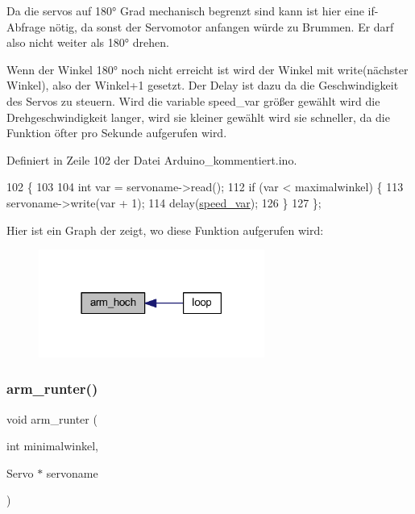 Da die servos auf 180° Grad mechanisch begrenzt sind kann ist hier eine if-\/\+Abfrage nötig, da sonst der Servomotor anfangen würde zu Brummen. Er darf also nicht weiter als 180° drehen.

Wenn der Winkel 180° noch nicht erreicht ist wird der Winkel mit write(nächster Winkel), also der Winkel+1 gesetzt. Der Delay ist dazu da die Geschwindigkeit des Servos zu steuern. Wird die variable speed\+\_\+var größer gewählt wird die Drehgeschwindigkeit langer, wird sie kleiner gewählt wird sie schneller, da die Funktion öfter pro Sekunde aufgerufen wird.

Definiert in Zeile 102 der Datei Arduino\+\_\+kommentiert.\+ino.


\begin{DoxyCode}
102                                                     \{
103 
104   \textcolor{keywordtype}{int} var = servoname->read(); 
112   \textcolor{keywordflow}{if} (var < maximalwinkel) \{
113     servoname->write(var + 1);
114     delay(\hyperlink{_arduino__kommentiert_8ino_a8b03f5396d8e845086daab48dcaca5cb}{speed\_var});
126   \}
127 \};
\end{DoxyCode}
Hier ist ein Graph der zeigt, wo diese Funktion aufgerufen wird\+:\nopagebreak
\begin{figure}[H]
\begin{center}
\leavevmode
\includegraphics[width=210pt]{_arduino__kommentiert_8ino_a74bfcf85e5418694eb99df53d30c8fab_icgraph}
\end{center}
\end{figure}
\mbox{\label{_arduino__kommentiert_8ino_a5b873994166a952d81f787c307ca08d9}} 
\subsubsection{\texorpdfstring{arm\+\_\+runter()}{arm\_runter()}}
{\footnotesize\ttfamily void arm\+\_\+runter (\begin{DoxyParamCaption}\item[{int}]{minimalwinkel,  }\item[{Servo $\ast$}]{servoname }\end{DoxyParamCaption})}



